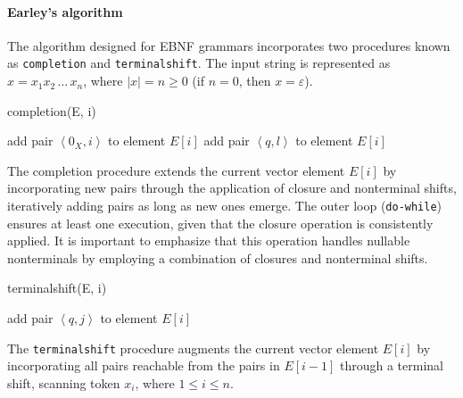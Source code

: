\paragraph*{Earley's algorithm}
The algorithm designed for EBNF grammars incorporates two procedures known as \texttt{completion} and \texttt{terminalshift}.
The input string is represented as $x = x_1 x_2 \,\ldots\, x_n$, where $|x| = n \geq 0$ (if $n = 0$, then $x = \varepsilon$).
\begin{algorithm}[H]
  \caption{completion(E, i)}
      \begin{algorithmic}[1]
                  \State add pair $\left\langle 0_X,i \right\rangle$ to element $E[i]$
              \EndFor
                      \State add pair $\left\langle q,l \right\rangle$ to element $E[i]$
                  \EndFor
              \EndFor
          \EndWhile 
      \end{algorithmic}
\end{algorithm}
The completion procedure extends the current vector element $E[i]$ by incorporating new pairs through the application of closure and nonterminal shifts, iteratively adding pairs as long as new ones emerge.
The outer loop (\texttt{do-while}) ensures at least one execution, given that the closure operation is consistently applied.
It is important to emphasize that this operation handles nullable nonterminals by employing a combination of closures and nonterminal shifts.
\begin{algorithm}[H]
  \caption{terminalshift(E, i)}
      \begin{algorithmic}[1]
              \State add pair $\left\langle q,j \right\rangle$ to element $E[i]$
          \EndFor
      \end{algorithmic}
\end{algorithm}
The \texttt{terminalshift} procedure augments the current vector element $E[i]$ by incorporating all pairs reachable from the pairs in $E[i-1]$ through a terminal shift, scanning token $x_i$, where $1 \leq i \leq n$.
